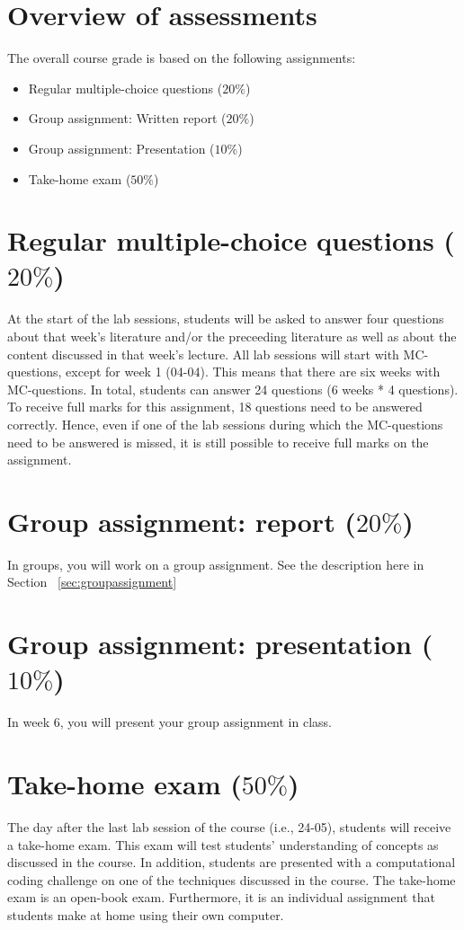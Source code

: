 \documentclass[a4paper,10pt,twocolumn]{report}
\begin{document}
	\section{Overview of assessments}
	The overall course grade is based on the following assignments:
	\begin{itemize}
		\item Regular multiple-choice questions (\(20\%\))
		\item Group assignment: Written report (\(20\%\))
		\item Group assignment: Presentation (\(10\%\))
		\item Take-home exam (\(50\%\))
	\end{itemize}

\section{Regular multiple-choice questions ($20\%$)}
At the start of the lab sessions, students will be asked to answer four questions about that week's literature and/or the preceeding literature as well as about the content discussed in that week's lecture. All lab sessions will start with MC-questions, except for week 1 (04-04). This means that there are six weeks with MC-questions. In total, students can answer 24 questions (6 weeks * 4 questions). To receive full marks for this assignment, 18 questions need to be answered correctly. Hence, even if one of the lab sessions during which the MC-questions need to be answered is missed, it is still possible to receive full marks on the assignment. 
	
\section{Group assignment: report ($20\%$)}
In groups, you will work on a group assignment. See the description here in Section ~\ref{sec:groupassignment}

\section{Group assignment: presentation ($10\%$)}
In week 6, you will present your group assignment in class. 

\section{Take-home exam ($50\%$)}
The day after the last lab session of the course (i.e., 24-05), students will receive a take-home exam. This exam will test students' understanding of concepts as discussed in the course. In addition, students are presented with a computational coding challenge on one of the techniques discussed in the course. The take-home exam is an open-book exam. Furthermore, it is an individual assignment that students make at home using their own computer. 
\end{document}
